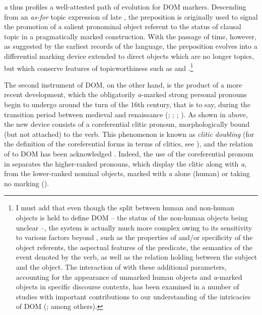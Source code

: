 \documentclass[output=paper]{LSP/langsci}
\begin{document}
  \textit{a} thus profiles a well-attested path of evolution for DOM markers. Descending from an \textit{as-for} topic expression of late , the preposition is originally used to signal the promotion of a salient pronominal object referent to the status of clausal topic in a pragmatically marked construction. With the passage of time, however, as suggested by the earliest records of the  language, the preposition evolves into a differential marking device extended to direct objects which are no longer topics, but which conserve features of topicworthiness such as  and  \citep{Iemmolo2010Topicality}.\footnote{I must add that even though the split between human and non-human objects is held to define  DOM \citep[82]{Leonetti2004Specificity} – the status of the non-human  objects being unclear \citep[4]{vonHeusinger2008Verbal} –, the system is actually much more complex owing to its sensitivity to various factors beyond , such as the properties of  and/or specificity of the object referents, the aspectual features of the predicate, the semantics of the event denoted by the verb, as well as the relation holding between the subject and the object. The interaction of  with these additional parameters, accounting for the appearance of unmarked human objects and \textit{a}-marked  objects in specific discourse contexts, has been examined in a number of studies with important contributions to our understanding of the intricacies of  DOM (\citealt{Kliffer1984Personal,Pensado1995Complemento,Torrego1999Gramatica,Company2002Grammaticalization,Delbecque2002Construction,Aissen2003Differential,vonHeusingeretal2003Interaction,Leonetti2004Specificity,Garcia2007Inanimate,GarciaGarcia2014Objektmarkierung,vonHeusinger2008Verbal}; among others).} 

 The second instrument of  DOM, on the other hand, is the product of a more recent development, which the obligatorily \textit{a}-marked strong personal pronouns begin to undergo around the turn of the 16th century, that is to say, during the transition period between medieval and renaissance  (\citealt[83]{Keniston1937Syntax}; \citealt{Silva-Corvalan1984Semantic}; \citealt{Rini1991Redundant}; \citealt{Gabrieletal2010Information}). As shown in  above, the new device consists of a coreferential clitic pronoun, morphologically bound (but not attached) to the verb. This phenomenon is known as \textit{clitic doubling} (for the definition of the coreferential forms in terms of clitics, see ), and the relation of  to DOM has been acknowledged \citep[221–224]{Bossong1998Marquage}. Indeed, the use of the coreferential pronoun in  separates the higher-ranked pronouns, which display the clitic along with \textit{a}, from the lower-ranked nominal objects, marked with \textit{a} alone (human) or taking no marking ().
\end{document}
